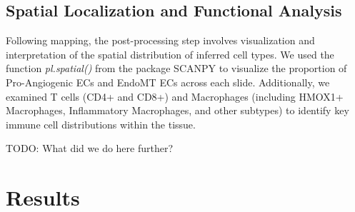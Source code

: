 \documentclass[a4paper,12pt]{article}
\begin{document}
\subsection{Spatial Localization and Functional Analysis}

Following mapping, the post-processing step involves visualization and interpretation of the spatial distribution of inferred cell types. We used the function \textit{pl.spatial()} from the package SCANPY \citep{scanpy} to visualize the proportion of Pro-Angiogenic ECs and EndoMT ECs across each slide. Additionally, we examined T cells (CD4+ and CD8+) and Macrophages (including HMOX1+ Macrophages, Inflammatory Macrophages, and other subtypes) to identify key immune cell distributions within the tissue.

TODO: What did we do here further?

\newpage

\section{Results}

\end{document}
